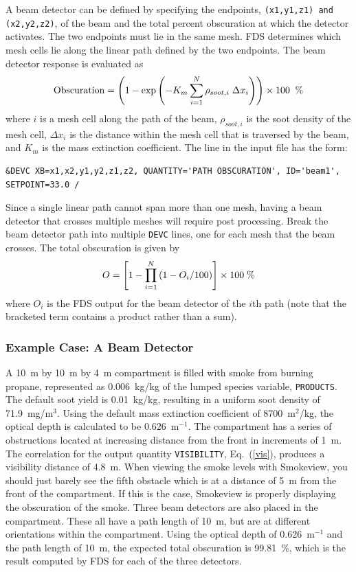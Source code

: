 \documentclass[11pt]{book}
\newcommand{\ct}{\tt\small}
\newcommand{\be}{\begin{equation}}
\newcommand{\ee}{\end{equation}}
\begin{document}
A beam detector can be defined by specifying the endpoints, {\ct (x1,y1,z1) and (x2,y2,z2)}, of the beam and the
total percent obscuration at which the detector activates.  The two endpoints must lie in the same mesh.  FDS determines which mesh
cells lie along the linear path defined by the two endpoints.  The beam detector response is evaluated as
\be
  \hbox{Obscuration}  = \left(1 - \exp \left( -K_m \sum_{i=1}^N {\rho_{soot,i}\; \Delta x_i} \right)  \right) \times 100  \; \; \hbox{\%}
\ee
where $i$ is a mesh cell along the path of the beam, $\rho_{soot,i}$ is the soot density of the mesh cell, $ \Delta x_i$
is the distance within the mesh cell that is traversed by the beam, and $K_m$ is the mass extinction coefficient. The line in the input file has the form:

\footnotesize
\begin{verbatim}
&DEVC XB=x1,x2,y1,y2,z1,z2, QUANTITY='PATH OBSCURATION', ID='beam1', SETPOINT=33.0 /
\end{verbatim}
\normalsize

\noindent
Since a single linear path cannot span more than one mesh, having a beam detector that crosses multiple meshes will require post processing.
Break the beam detector path into multiple {\ct DEVC} lines, one for each mesh that the beam crosses.  The total obscuration is given by
\be
  O  = \left[ 1 -  \prod_{i=1}^N \left( 1-O_i/100 \right)  \right] \times 100  \; \hbox{\%}
\ee
where $O_i$ is the FDS output for the beam detector of the $i$th path (note that the bracketed term contains a product rather than a sum).

\subsubsection{Example Case: A Beam Detector}

A 10~m by 10~m by 4~m compartment is filled with smoke from burning propane, represented as 0.006~kg/kg of
the lumped species variable, {\ct PRODUCTS}. The default soot yield is
0.01~kg/kg, resulting in a uniform soot density of 71.9~mg/m$^3$.
Using the default mass extinction coefficient of
8700~m$^2$/kg, the optical depth is calculated to be 0.626~m$^{-1}$.  The
compartment has a series of obstructions located at increasing distance from the front in increments of
1~m.  The correlation for the output quantity
{\ct VISIBILITY}, Eq.~(\ref{vis}), produces a visibility distance of 4.8~m.
When viewing the smoke levels with Smokeview, you should just barely see
the fifth obstacle which is at a distance of 5~m from the front of the compartment.
If this is the case, Smokeview is properly displaying the obscuration of the
smoke.  Three beam detectors are also
placed in the compartment.  These all have a path length of 10~m,
but are at different orientations within the compartment.
Using the optical depth of 0.626~m$^{-1}$ and the path length of
10~m, the expected total obscuration is 99.81~\%, which is the
result computed by FDS for each of the three detectors.
\end{document}
